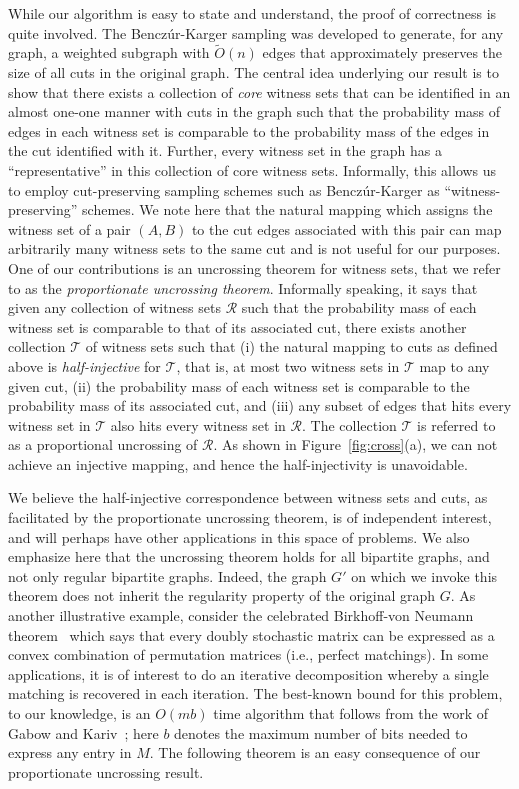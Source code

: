 \documentclass[11pt]{article}
\newcommand{\coll}{{\mathcal R}}
\newcommand{\colltwo}{{\mathcal T}}
\begin{document}
While our algorithm is easy to state and understand, the proof of correctness
is quite involved. The Bencz\'{u}r-Karger sampling was developed to generate, for
any graph, a weighted subgraph with $\tilde{O}(n)$ edges that approximately
preserves the size of all cuts in the original graph. The central idea
underlying our result is to show that there exists a collection of {\em core}
witness sets that can be identified in an almost one-one manner with cuts in
the graph such that the probability mass of edges in each witness set is
comparable to the probability mass of the edges in the cut identified with
it. Further, every witness set in the graph has a ``representative'' in this
collection of core witness sets. Informally, this allows us to employ
cut-preserving sampling schemes such as Bencz\'{u}r-Karger as
``witness-preserving'' schemes. We note here that the natural mapping which
assigns the witness set of a pair $(A,B)$ to the cut edges associated with
this pair can map arbitrarily many witness sets to the same cut and is not
useful for our purposes. One of our contributions is an uncrossing
theorem for witness sets, that we refer to as the {\em proportionate
  uncrossing theorem}.  Informally speaking, it says that given any collection
of witness sets $\coll$ such that the probability mass of each witness set is
comparable to that of its associated cut, there exists another collection
$\colltwo$ of witness sets such that (i) the natural mapping to cuts as
defined above is {\em half-injective} for $\colltwo$, that is, at most two
witness sets in $\colltwo$ map to any given cut, (ii) the probability mass of
each witness set is comparable to the probability mass of its associated cut,
and (iii) any subset of edges that hits every witness set in $\colltwo$ also
hits every witness set in $\coll$.  The collection $\colltwo$ is referred to
as a proportional uncrossing of $\coll$. As shown in
Figure~\ref{fig:cross}(a), we can not achieve an injective mapping, and hence
the half-injectivity is unavoidable.

We believe the half-injective correspondence between witness sets and cuts, as
facilitated by the proportionate uncrossing theorem, is of independent
interest, and will perhaps have other applications in this space of
problems. We also emphasize here that the uncrossing theorem holds for all
bipartite graphs, and not only regular bipartite graphs. Indeed, the graph
$G'$ on which we invoke this theorem does not inherit the regularity property
of the original graph $G$.  As another illustrative example, consider the
celebrated Birkhoff-von Neumann theorem~\cite{b:graphtheory,vn:bvn53} which
says that every doubly stochastic matrix can be expressed as a convex
combination of permutation matrices (i.e., perfect matchings).  In some
applications, it is of interest to do an iterative decomposition whereby a
single matching is recovered in each iteration. The best-known bound for this
problem, to our knowledge, is an $O(mb)$ time algorithm that follows from the
work of Gabow and Kariv~\cite{gk:edge1982}; here $b$ denotes the maximum
number of bits needed to express any entry in $M$. The following theorem is an
easy consequence of our proportionate uncrossing result.
\end{document}
